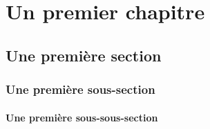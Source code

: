 

\begin{comment}

\documentclass[a4paper, 11pt, twoside, fleqn]{memoir}





	\openleft %

\end{comment}

	\chapter{Un premier  chapitre}
	\ChapFrame %

	\section{Une première section}
	\lipsum[1]

	\subsection{Une première sous-section}
	\lipsum[1-3]

	\subsubsection{Une première sous-sous-section}
	\lipsum[1-2]

%

